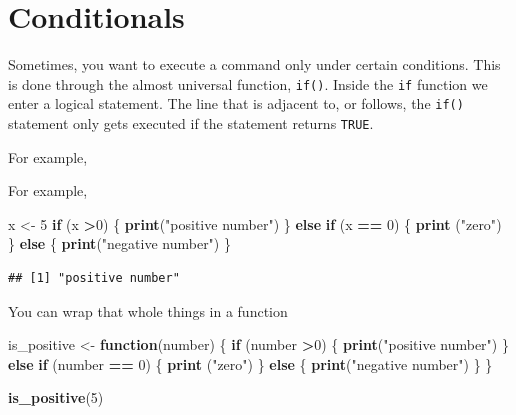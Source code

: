 \documentclass[]{book}
\newenvironment{Shaded}{\begin{snugshade}}{\end{snugshade}}
\newcommand{\KeywordTok}[1]{\textcolor[rgb]{0.13,0.29,0.53}{\textbf{#1}}}
\newcommand{\DecValTok}[1]{\textcolor[rgb]{0.00,0.00,0.81}{#1}}
\newcommand{\StringTok}[1]{\textcolor[rgb]{0.31,0.60,0.02}{#1}}
\newcommand{\ControlFlowTok}[1]{\textcolor[rgb]{0.13,0.29,0.53}{\textbf{#1}}}
\newcommand{\OperatorTok}[1]{\textcolor[rgb]{0.81,0.36,0.00}{\textbf{#1}}}
\newcommand{\NormalTok}[1]{#1}
\theoremstyle{definition}
\theoremstyle{definition}
\theoremstyle{definition}
\theoremstyle{remark}
\begin{document}
\section{Conditionals}\label{conditionals}

Sometimes, you want to execute a command only under certain conditions.
This is done through the almost universal function, \texttt{if()}.
Inside the \texttt{if} function we enter a logical statement. The line
that is adjacent to, or follows, the \texttt{if()} statement only gets
executed if the statement returns \texttt{TRUE}.

For example,

For example,

\begin{Shaded}
\begin{Highlighting}[]
\NormalTok{x <-}\StringTok{ }\DecValTok{5}
\ControlFlowTok{if}\NormalTok{ (x }\OperatorTok{>}\DecValTok{0}\NormalTok{) \{}
  \KeywordTok{print}\NormalTok{(}\StringTok{"positive number"}\NormalTok{)}
\NormalTok{\} }\ControlFlowTok{else} \ControlFlowTok{if}\NormalTok{ (x }\OperatorTok{==}\StringTok{ }\DecValTok{0}\NormalTok{)  \{}
  \KeywordTok{print}\NormalTok{ (}\StringTok{"zero"}\NormalTok{)}
\NormalTok{\} }\ControlFlowTok{else}\NormalTok{ \{}
  \KeywordTok{print}\NormalTok{(}\StringTok{"negative number"}\NormalTok{)}
\NormalTok{\}}
\end{Highlighting}
\end{Shaded}

\begin{verbatim}
## [1] "positive number"
\end{verbatim}

You can wrap that whole things in a function

\begin{Shaded}
\begin{Highlighting}[]
\NormalTok{is_positive <-}\StringTok{ }\ControlFlowTok{function}\NormalTok{(number) \{}
  \ControlFlowTok{if}\NormalTok{ (number }\OperatorTok{>}\DecValTok{0}\NormalTok{) \{}
    \KeywordTok{print}\NormalTok{(}\StringTok{"positive number"}\NormalTok{)}
\NormalTok{  \} }\ControlFlowTok{else} \ControlFlowTok{if}\NormalTok{ (number }\OperatorTok{==}\StringTok{ }\DecValTok{0}\NormalTok{)  \{}
    \KeywordTok{print}\NormalTok{ (}\StringTok{"zero"}\NormalTok{)}
\NormalTok{  \} }\ControlFlowTok{else}\NormalTok{ \{}
    \KeywordTok{print}\NormalTok{(}\StringTok{"negative number"}\NormalTok{)}
\NormalTok{  \}}
\NormalTok{\}}

\KeywordTok{is_positive}\NormalTok{(}\DecValTok{5}\NormalTok{)}
\end{Highlighting}
\end{Shaded}
\end{document}
